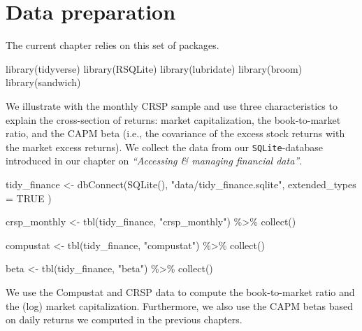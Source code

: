 \documentclass[
]{krantz}
\newenvironment{Shaded}{\begin{snugshade}}{\end{snugshade}}
\newcommand{\AttributeTok}[1]{\textcolor[rgb]{0.61,0.61,0.61}{#1}}
\newcommand{\ConstantTok}[1]{\textcolor[rgb]{0,0,0}{#1}}
\newcommand{\FunctionTok}[1]{\textcolor[rgb]{0,0,0}{#1}}
\newcommand{\NormalTok}[1]{#1}
\newcommand{\OtherTok}[1]{\textcolor[rgb]{0.37,0.37,0.37}{#1}}
\newcommand{\SpecialCharTok}[1]{\textcolor[rgb]{0,0,0}{#1}}
\newcommand{\StringTok}[1]{\textcolor[rgb]{0.5,0.5,0.5}{#1}}
\begin{document}
\hypertarget{data-preparation-4}{%
\section{Data preparation}\label{data-preparation-4}}

The current chapter relies on this set of packages.

\begin{Shaded}
\begin{Highlighting}[]
\FunctionTok{library}\NormalTok{(tidyverse)}
\FunctionTok{library}\NormalTok{(RSQLite)}
\FunctionTok{library}\NormalTok{(lubridate)}
\FunctionTok{library}\NormalTok{(broom)}
\FunctionTok{library}\NormalTok{(sandwich)}
\end{Highlighting}
\end{Shaded}

We illustrate \citet{Fama1973} with the monthly CRSP sample and use three characteristics to explain the cross-section of returns: market capitalization, the book-to-market ratio, and the CAPM beta (i.e., the covariance of the excess stock returns with the market excess returns). We collect the data from our \texttt{SQLite}-database introduced in our chapter on \emph{``Accessing \& managing financial data''}.

\begin{Shaded}
\begin{Highlighting}[]
\NormalTok{tidy\_finance }\OtherTok{\textless{}{-}} \FunctionTok{dbConnect}\NormalTok{(}\FunctionTok{SQLite}\NormalTok{(), }\StringTok{"data/tidy\_finance.sqlite"}\NormalTok{,}
  \AttributeTok{extended\_types =} \ConstantTok{TRUE}
\NormalTok{)}

\NormalTok{crsp\_monthly }\OtherTok{\textless{}{-}} \FunctionTok{tbl}\NormalTok{(tidy\_finance, }\StringTok{"crsp\_monthly"}\NormalTok{) }\SpecialCharTok{\%\textgreater{}\%}
  \FunctionTok{collect}\NormalTok{()}

\NormalTok{compustat }\OtherTok{\textless{}{-}} \FunctionTok{tbl}\NormalTok{(tidy\_finance, }\StringTok{"compustat"}\NormalTok{) }\SpecialCharTok{\%\textgreater{}\%}
  \FunctionTok{collect}\NormalTok{()}

\NormalTok{beta }\OtherTok{\textless{}{-}} \FunctionTok{tbl}\NormalTok{(tidy\_finance, }\StringTok{"beta"}\NormalTok{) }\SpecialCharTok{\%\textgreater{}\%}
  \FunctionTok{collect}\NormalTok{()}
\end{Highlighting}
\end{Shaded}

We use the Compustat and CRSP data to compute the book-to-market ratio and the (log) market capitalization.
Furthermore, we also use the CAPM betas based on daily returns we computed in the previous chapters.
\end{document}
